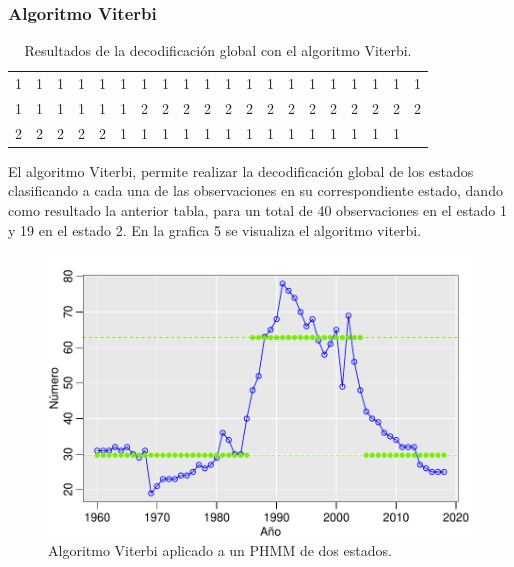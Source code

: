 \documentclass[a4paper]{article}\usepackage[]{graphicx}\usepackage[]{color}
\makeatletter
\def\maxwidth{ %
  \ifdim\Gin@nat@width>\linewidth
    \linewidth
  \else
    \Gin@nat@width
  \fi
}
\newenvironment{knitrout}{}{} %
\makeatother
\begin{document}
\subsubsection*{Algoritmo Viterbi}

\begin{table}[ht]
\centering
\begin{tabular}{rrrrrrrrrrrrrrrrrrrr}
  \hline
  \hline
1 & 1 & 1 & 1 & 1 & 1 & 1 & 1 & 1 & 1 & 1 & 1 & 1 & 1 & 1 & 1 & 1 & 1 & 1 & 1 \\ 
  1 & 1 & 1 & 1 & 1 & 1 & 2 & 2 & 2 & 2 & 2 & 2 & 2 & 2 & 2 & 2 & 2 & 2 & 2 & 2 \\ 
  2 & 2 & 2 & 2 & 2 & 1 & 1 & 1 & 1 & 1 & 1 & 1 & 1 & 1 & 1 & 1 & 1 & 1 & 1 &  \\ 
   \hline
\end{tabular}
\caption{Resultados de la decodificación global con el algoritmo Viterbi.} 
\end{table}


El algoritmo Viterbi, permite realizar la decodificación global de los estados clasificando a cada una de las observaciones en su correspondiente estado, dando como resultado la anterior tabla, para un total de 40 observaciones en el estado 1 y 19 en el estado 2. En la grafica 5 se visualiza el algoritmo viterbi.

\begin{knitrout}
\color{fgcolor}\begin{figure}
\includegraphics[width=\maxwidth]{figure/unnamed-chunk-18-1} \caption[Algoritmo Viterbi aplicado a un PHMM de dos estados]{Algoritmo Viterbi aplicado a un PHMM de dos estados.}\label{fig:unnamed-chunk-18}
\end{figure}


\end{knitrout}
\end{document}
